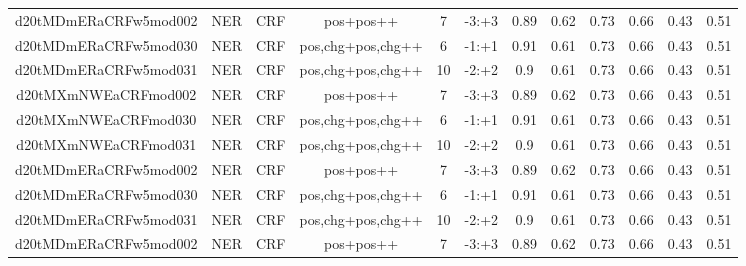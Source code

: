 \documentclass[a4paper]{article}
\begin{document}
\begin{landscape}
\begin{center}
\begin{tabular}{ |c|c|c|c|c|c|c|c|c|c|c|c|}
 
 	
 	\small{ d20tMDmERaCRFw5mod002 } & \small{ NER} & \small{  CRF }  & pos+pos++  &  7 &  \small{  -3:+3 }  &  0.89 & 0.62 & 0.73  &  0.66 & 0.43 & 0.51 \\
 	

 
 	
 	\small{ d20tMDmERaCRFw5mod030 } & \small{ NER} & \small{  CRF }  & pos,chg+pos,chg++  &  6 &  \small{  -1:+1 }  &  0.91 & 0.61 & 0.73  &  0.66 & 0.43 & 0.51 \\
 	

 
 	
 	\small{ d20tMDmERaCRFw5mod031 } & \small{ NER} & \small{  CRF }  & pos,chg+pos,chg++  &  10 &  \small{  -2:+2 }  &  0.9 & 0.61 & 0.73  &  0.66 & 0.43 & 0.51 \\
 	

 
 	
 	\small{ d20tMXmNWEaCRFmod002 } & \small{ NER} & \small{  CRF }  & pos+pos++  &  7 &  \small{  -3:+3 }  &  0.89 & 0.62 & 0.73  &  0.66 & 0.43 & 0.51 \\
 	

 
 	
 	\small{ d20tMXmNWEaCRFmod030 } & \small{ NER} & \small{  CRF }  & pos,chg+pos,chg++  &  6 &  \small{  -1:+1 }  &  0.91 & 0.61 & 0.73  &  0.66 & 0.43 & 0.51 \\
 	

 
 	
 	\small{ d20tMXmNWEaCRFmod031 } & \small{ NER} & \small{  CRF }  & pos,chg+pos,chg++  &  10 &  \small{  -2:+2 }  &  0.9 & 0.61 & 0.73  &  0.66 & 0.43 & 0.51 \\
 	

 
 	
 	\small{ d20tMDmERaCRFw5mod002 } & \small{ NER} & \small{  CRF }  & pos+pos++  &  7 &  \small{  -3:+3 }  &  0.89 & 0.62 & 0.73  &  0.66 & 0.43 & 0.51 \\
 	

 
 	
 	\small{ d20tMDmERaCRFw5mod030 } & \small{ NER} & \small{  CRF }  & pos,chg+pos,chg++  &  6 &  \small{  -1:+1 }  &  0.91 & 0.61 & 0.73  &  0.66 & 0.43 & 0.51 \\
 	

 
 	
 	\small{ d20tMDmERaCRFw5mod031 } & \small{ NER} & \small{  CRF }  & pos,chg+pos,chg++  &  10 &  \small{  -2:+2 }  &  0.9 & 0.61 & 0.73  &  0.66 & 0.43 & 0.51 \\
 	

 
 	
 	\small{ d20tMDmERaCRFw5mod002 } & \small{ NER} & \small{  CRF }  & pos+pos++  &  7 &  \small{  -3:+3 }  &  0.89 & 0.62 & 0.73  &  0.66 & 0.43 & 0.51 \\
 	

\end{tabular}
\end{center}
\end{landscape}
\end{document}
